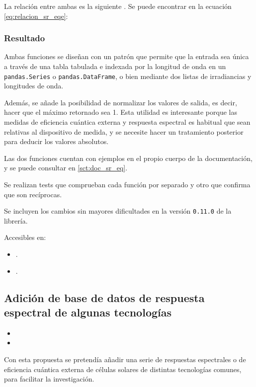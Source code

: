 La relación entre ambas es la siguiente \cite[pp. 15-16, Eq. ]{Markvart2012-un}. Se puede encontrar en la ecuación \ref{eq:relacion_sr_eqe}:

\subsubsection{Resultado}

Ambas funciones se diseñan con un patrón que permite que la entrada sea única a través de una tabla tabulada e indexada por la longitud de onda en un \texttt{pandas.Series} o \texttt{pandas.DataFrame}, o bien mediante dos listas de irradiancias y longitudes de onda.

Además, se añade la posibilidad de normalizar los valores de salida, es decir, hacer que el máximo retornado sea 1. Esta utilidad es interesante porque las medidas de eficiencia cuántica externa y respuesta espectral es habitual que sean relativas al dispositivo de medida, y se necesite hacer un tratamiento posterior para deducir los valores absolutos.

Las dos funciones cuentan con ejemplos en el propio cuerpo de la documentación, y se puede consultar en \ref{sct:doc_sr_eq}.

Se realizan tests que comprueban cada función por separado y otro que confirma que son recíprocas.

Se incluyen los cambios sin mayores dificultades en la versión \texttt{0.11.0} de la librería.

Accesibles en:

\begin{itemize}
    \item {}.
    \item {}.
\end{itemize}

\subsection{Adición de base de datos de respuesta espectral de algunas tecnologías}

\begin{itemize}
    \item {}
    \item {}
\end{itemize}

Con esta propuesta se pretendía añadir una serie de respuestas espectrales o de eficiencia cuántica externa de células solares de distintas tecnologías comunes, para facilitar la investigación.

